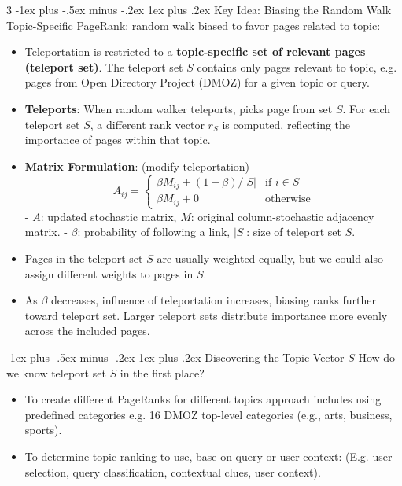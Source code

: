 \documentclass[a4paper, 9pt, landscape]{article}
\makeatletter
\renewcommand{\subsubsection}{\@startsection{subsubsection}{3}{0mm}%
                                {-1ex plus -.5ex minus -.2ex}%
                                {1ex plus .2ex}%
                                {\normalfont\small\bfseries}}
\makeatother
\begin{document}
\begin{multicols*}{3}
\subsubsection{Key Idea: Biasing the Random Walk}
Topic-Specific PageRank: random walk biased to favor pages related to topic:
\begin{itemize}
\item Teleportation is restricted to a \textbf{topic-specific set of relevant pages (teleport set)}. The teleport set $ S $ contains only pages relevant to topic, e.g. pages from Open Directory Project (DMOZ) for a given topic or query.
\item \textbf{Teleports}: When random walker teleports, picks page from set $ S $. For each teleport set $ S $, a different rank vector $ r_S $ is computed, reflecting the importance of pages within that topic.
\item \textbf{Matrix Formulation}: (modify teleportation)
\[
A_{ij} = 
\begin{cases} 
\beta M_{ij} + (1-\beta)/|S| & \text{if } i \in S \\
\beta M_{ij} + 0 & \text{otherwise}
\end{cases}
\]
- $ A $: updated stochastic matrix, $M$: original column-stochastic adjacency matrix.
- $ \beta $: probability of following a link, $|S|$: size of teleport set $ S $.
\item Pages in the teleport set $ S $ are usually weighted equally, but we could also assign different weights to pages in $ S $.
\item As $ \beta $ decreases, influence of teleportation increases, biasing ranks further toward teleport set. Larger teleport sets distribute importance more evenly across the included pages.
\end{itemize}

\subsubsection{Discovering the Topic Vector $ S $}
How do we know teleport set $ S $ in the first place?
\begin{itemize}
\item To create different PageRanks for different topics approach includes using predefined categories e.g. 16 DMOZ top-level categories (e.g., arts, business, sports). 
\item To determine topic ranking to use, base on query or user context: (E.g. user selection, query classification, contextual clues, user context).
\end{itemize}
 

\end{multicols*}
\end{document}
